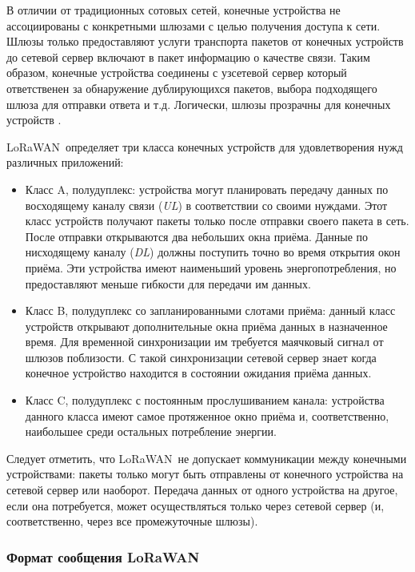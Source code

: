 В отличии от традиционных сотовых сетей, конечные устройства не ассоциированы с 
конкретными шлюзами с целью получения доступа к сети.
Шлюзы только предоставляют услуги транспорта пакетов от конечных устройств до 
сетевой сервер включают в пакет информацию о качестве связи. 
Таким образом, конечные устройства соединены с узсетевой сервер который 
ответственен за обнаружение дублирующихся пакетов, выбора подходящего шлюза для 
отправки ответа и т.д.
Логически, шлюзы прозрачны для конечных устройств \cite{augustin2016}.

LoRaWAN\texttrademark~определяет три класса конечных устройств для 
удовлетворения нужд различных приложений:
\begin{itemize}
 \item Класс A, полудуплекс: устройства могут планировать передачу данных по 
восходящему каналу связи (\textit{UL}) в соответствии со своими нуждами. Этот 
класс устройств получают пакеты только после отправки своего пакета в сеть. 
После отправки открываются два небольших окна приёма. Данные по нисходящему 
каналу (\textit{DL}) должны поступить точно во время открытия окон приёма. Эти 
устройства имеют наименьший уровень энергопотребления, но предоставляют меньше 
гибкости для передачи им данных.
 \item Класс B, полудуплекс со запланированными слотами приёма: данный класс 
устройств открывают дополнительные окна приёма данных в назначенное время. Для 
временной синхронизации им требуется маячковый сигнал от шлюзов поблизости. С 
такой синхронизации сетевой сервер знает когда конечное устройство находится в 
состоянии ожидания приёма данных.
 \item Класс C, полудуплекс с постоянным прослушиванием канала: устройства 
данного класса имеют самое протяженное окно приёма и, соответственно, 
наибольшее 
среди остальных потребление энергии.
\end{itemize}

Следует отметить, что LoRaWAN\texttrademark~не допускает коммуникации между 
конечными устройствами: пакеты только могут быть отправлены от конечного 
устройства на сетевой сервер или наоборот. 
Передача данных от одного устройства на другое, если она потребуется, может 
осуществляться только через сетевой сервер (и, соответственно, через все 
промежуточные шлюзы).

\subsubsection{Формат сообщения LoRaWAN\texttrademark} 

